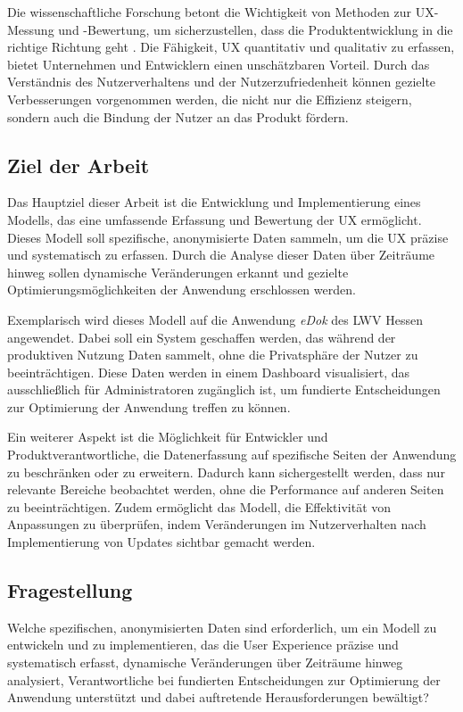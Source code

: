 \documentclass[12pt,oneside]{article}
\begin{document}
Die wissenschaftliche Forschung betont die Wichtigkeit von Methoden zur UX-Messung und -Bewertung, um sicherzustellen, dass die Produktentwicklung in die richtige Richtung geht \cite{Virpi}. Die Fähigkeit, UX quantitativ und qualitativ zu erfassen, bietet Unternehmen und Entwicklern einen unschätzbaren Vorteil. Durch das Verständnis des Nutzerverhaltens und der Nutzerzufriedenheit können gezielte Verbesserungen vorgenommen werden, die nicht nur die Effizienz steigern, sondern auch die Bindung der Nutzer an das Produkt fördern.

\subsection{Ziel der Arbeit}

Das Hauptziel dieser Arbeit ist die Entwicklung und Implementierung eines Modells, das eine umfassende Erfassung und Bewertung der UX ermöglicht. Dieses Modell soll spezifische, anonymisierte Daten sammeln, um die UX präzise und systematisch zu erfassen. Durch die Analyse dieser Daten über Zeiträume hinweg sollen dynamische Veränderungen erkannt und gezielte Optimierungsmöglichkeiten der Anwendung erschlossen werden.

Exemplarisch wird dieses Modell auf die Anwendung \textit{eDok} des LWV Hessen angewendet. Dabei soll ein System geschaffen werden, das während der produktiven Nutzung Daten sammelt, ohne die Privatsphäre der Nutzer zu beeinträchtigen. Diese Daten werden in einem Dashboard visualisiert, das ausschließlich für Administratoren zugänglich ist, um fundierte Entscheidungen zur Optimierung der Anwendung treffen zu können.

Ein weiterer Aspekt ist die Möglichkeit für Entwickler und Produktverantwortliche, die Datenerfassung auf spezifische Seiten der Anwendung zu beschränken oder zu erweitern. Dadurch kann sichergestellt werden, dass nur relevante Bereiche beobachtet werden, ohne die Performance auf anderen Seiten zu beeinträchtigen. Zudem ermöglicht das Modell, die Effektivität von Anpassungen zu überprüfen, indem Veränderungen im Nutzerverhalten nach Implementierung von Updates sichtbar gemacht werden.

\subsection{Fragestellung}

Welche spezifischen, anonymisierten Daten sind erforderlich, um ein Modell zu entwickeln und zu implementieren, das die User Experience präzise und systematisch erfasst, dynamische Veränderungen über Zeiträume hinweg analysiert, Verantwortliche bei fundierten Entscheidungen zur Optimierung der Anwendung unterstützt und dabei auftretende Herausforderungen bewältigt?
\end{document}
